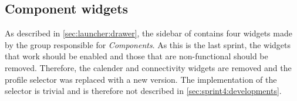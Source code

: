 \subsection{\giraf Component widgets}
As described in \cref{sec:launcher:drawer}, the sidebar of \launcher contains four widgets made by the group responsible for \textit{\giraf Components}.
As this is the last sprint, the widgets that work should be enabled and those that are non-functional should be removed.
Therefore, the calender and connectivity widgets are removed and the profile selector was replaced with a new version.
The implementation of the selector is trivial and is therefore not described in \cref{sec:sprint4:developments}.